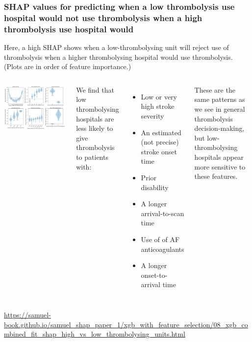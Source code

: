 \documentclass[xcolor={usenames,dvipsnames}]{beamer}
\newcommand{\smallurl}[1]{\textcolor{blue}{\fontsize{4pt}{4.8pt}\selectfont \url{#1}}}
\begin{document}
\begin{frame}
\frametitle{SHAP values for predicting when a low thrombolysis use hospital would \textbf{not} use thrombolysis when a high thrombolysis use hospital would}


\tiny{Here, a high SHAP shows when a low-thrombolysing unit will reject use of thrombolysis when a higher thrombolysing hospital would use thrombolysis. (Plots are in order of feature importance.)}

\begin{columns}
    \vspace{-0.5em}
    \begin{center} 
    \includegraphics[width=\textwidth, trim=0 0 0 2.5em, clip]{./images/shap_not_use_thrombolysis}
    \end{center} 

    \tiny{We find that low thrombolysing hospitals are less likely to give thrombolysis to patients with:}

    \begin{itemize}
      \tiny
      \item Low or very high stroke severity
      \item An estimated (not precise) stroke onset time
      \item Prior disability
      \item A longer arrival-to-scan time
      \item Use of of AF anticoagulants
      \item A longer onset-to-arrival time
    \end{itemize}
    
    
    \vspace{0.5em}
    \tiny{These are the same patterns as we see in general thrombolysis decision-making,
    but low-thrombolysing hospitals appear more sensitive to these features.}
\end{columns}



\vspace{0.5em}
\smallurl{https://samuel-book.github.io/samuel_shap_paper_1/xgb_with_feature_selection/08_xgb_combined_fit_shap_high_vs_low_thrombolysing_units.html}

\end{frame}
\end{document}
